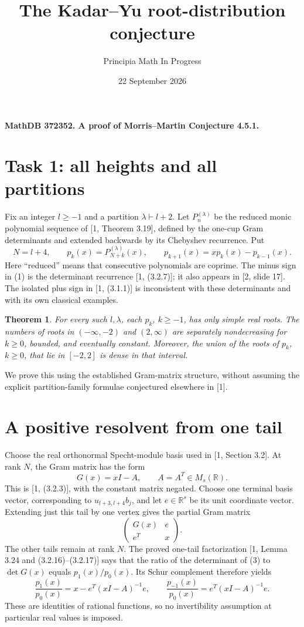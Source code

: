 \documentclass[11pt]{article}
\title{The Kadar--Yu root-distribution conjecture}
\author{Principia Math In Progress}
\date{22 September 2026}
\newtheorem{theorem}{Theorem}
\newcommand{\R}{\mathbb R}
\begin{document}
\maketitle
\noindent\textbf{MathDB 372352. A proof of Morris--Martin Conjecture 4.5.1.}

\section*{Task 1: all heights and all partitions}
Fix an integer \(l\ge-1\) and a partition \(\lambda\vdash l+2\).
Let \(P_n^{(\lambda)}\) be the reduced monic polynomial sequence
of [1, Theorem 3.19], defined by the one-cup Gram determinants
and extended backwards by its Chebyshev recurrence. Put
\[
 N=l+4,\qquad p_k(x)=P_{N+k}^{(\lambda)}(x),\qquad
 p_{k+1}(x)=xp_k(x)-p_{k-1}(x).                         \tag{1}
\]
Here ``reduced'' means that consecutive polynomials are coprime.
The minus sign in (1) is the determinant recurrence
[1, (3.2.7)]; it also appears in [2, slide 17].
The isolated plus sign in [1, (3.1.1)] is inconsistent with
these determinants and with its own classical examples.

\begin{theorem}
For every such \(l,\lambda\), each \(p_k\), \(k\ge-1\), has
only simple real roots. The numbers of roots in
\(( -\infty,-2)\) and \((2,\infty)\) are separately
nondecreasing for \(k\ge0\), bounded, and eventually constant.
Moreover, the union of the roots of \(p_k\), \(k\ge0\),
that lie in \([-2,2]\) is dense in that interval.
\end{theorem}

We prove this using the established Gram-matrix structure,
without assuming the explicit partition-family formulae
conjectured elsewhere in [1].

\section*{A positive resolvent from one tail}
Choose the real orthonormal Specht-module basis used in
[1, Section 3.2]. At rank \(N\), the Gram matrix has the form
\[
                         G(x)=xI-A,\qquad A=A^T\in M_s(\R).
                                                               \tag{2}
\]
This is [1, (3.2.3)], with the constant matrix negated.
Choose one terminal basis vector, corresponding to
\(u_{l+3,l+4}b_j\), and let \(e\in\R^s\) be its unit
coordinate vector. Extending just this tail by one vertex gives
the partial Gram matrix
\[
                  \begin{pmatrix}G(x)&e\\e^T&x\end{pmatrix}.
                                                               \tag{3}
\]
The other tails remain at rank \(N\). The proved one-tail
factorization [1, Lemma 3.24 and (3.2.16)--(3.2.17)] says
that the ratio of the determinant of (3) to \(\det G(x)\)
equals \(p_1(x)/p_0(x)\). Its Schur complement therefore yields
\[
 \frac{p_1(x)}{p_0(x)}=x-e^T(xI-A)^{-1}e,
 \qquad
 \frac{p_{-1}(x)}{p_0(x)}=e^T(xI-A)^{-1}e.             \tag{4}
\]
These are identities of rational functions, so no invertibility
assumption at particular real values is imposed.
\end{document}
